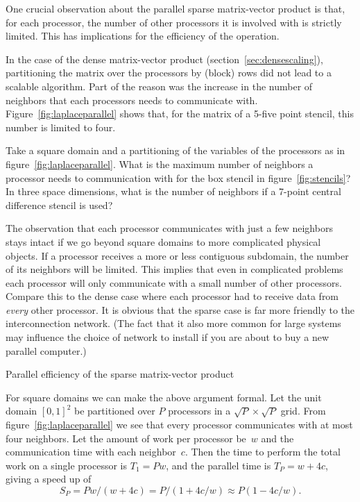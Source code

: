 One crucial observation about the parallel sparse matrix-vector
product
is that, for each processor, the number of
other processors it is involved with is strictly limited. This has
implications for the efficiency of the operation.

In the case of the dense matrix-vector product
(section~\ref{sec:densescaling}), partitioning the matrix over the
processors by (block) rows did not lead to a scalable algorithm. Part
of the reason was the increase in the number of neighbors that each
processors needs to communicate with. Figure~\ref{fig:laplaceparallel}
shows that, for the matrix of a 5-five point stencil, this number is
limited to four.

\begin{exercise}
  Take a square domain and a partitioning of the variables of the
  processors as in figure~\ref{fig:laplaceparallel}.
  What is the maximum number of neighbors a
  processor needs to communication with for the box stencil in
  figure~\ref{fig:stencils}? In three space dimensions, what is the
  number of neighbors if a 7-point central difference stencil is
  used?
\end{exercise}

The observation that each processor communicates with just a few
neighbors stays intact if we go beyond square domains to more
complicated physical objects. If a processor receives a more or less
contiguous subdomain, the number of its neighbors will be
limited. This implies that even in complicated problems each processor
will only communicate with a small number of other processors. Compare
this to the dense case where each processor had to receive data from
\emph{every} other processor. It is obvious that the sparse case is
far more friendly to the interconnection network. (The fact that it
also more common for large systems may influence the choice of network
to install if you are about to buy a new parallel computer.)

 {Parallel efficiency of the sparse matrix-vector product}
\label{sec:par-spmvp}

For square domains we can make the above argument formal.
Let the
unit domain $[0,1]^2$ be partitioned over $P$ processors in a $\sqrt
P\times \sqrt P$ grid. From figure~\ref{fig:laplaceparallel} we see
that every processor communicates with at most four neighbors. Let
the amount of work per processor be~$w$ and the communication time
with each neighbor~$c$. Then the time to perform the total work on a
single processor is $T_1=Pw$, and the parallel time is $T_P=w+4c$,
giving a speed up of
\[ S_P=Pw/(w+4c)=P/(1+4c/w)\approx P(1-4c/w). \]

